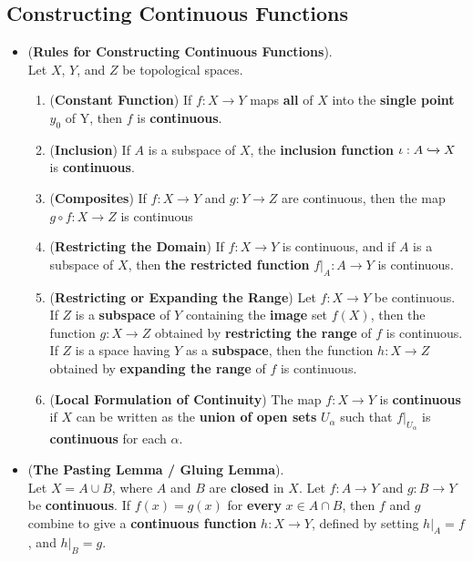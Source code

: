 \documentclass[11pt]{article}
\begin{document}
\subsection{Constructing Continuous Functions}
\begin{itemize}
\item \begin{proposition}(\textbf{Rules for Constructing Continuous Functions}). \citep{munkres2000topology}\\
Let $X$, $Y$, and $Z$ be topological spaces.
\begin{enumerate}
\item (\textbf{Constant Function}) If $f : X \rightarrow Y$ maps \textbf{all} of $X$ into the \textbf{single point} $y_0$ of Y, then $f$ is \textbf{continuous}.
\item (\textbf{Inclusion}) If $A$ is a subspace of $X$, the \textbf{inclusion function} $\iota : A \xhookrightarrow{} X$ is  \textbf{continuous}.
\item (\textbf{Composites}) If $f : X \rightarrow Y$ and $g : Y \rightarrow Z$ are continuous, then the map $g \circ f : X \rightarrow Z$ is continuous
\item (\textbf{Restricting the Domain}) If $f : X \rightarrow Y$ is continuous, and if $A$ is a subspace of $X$, then \textbf{the restricted function} $f|_{A}: A \rightarrow Y$ is continuous.
\item (\textbf{Restricting or Expanding the Range}) Let $f : X \rightarrow Y$ be continuous. If $Z$ is a \textbf{subspace} of $Y$ containing the \textbf{image} set $f(X)$, then the function $g : X \rightarrow Z$ obtained by \textbf{restricting the range} of $f$ is continuous.  If $Z$ is a space having $Y$ as a \textbf{subspace}, then the function $h : X \rightarrow Z$ obtained by \textbf{expanding the range} of $f$ is continuous.
\item (\textbf{Local Formulation of Continuity}) The map  $f : X \rightarrow Y$ is \textbf{continuous} if $X$ can be written as the \textbf{union of open sets} $U_{\alpha}$ such that $f|_{U_{\alpha}}$ is \textbf{continuous} for each $\alpha$.
\end{enumerate}
\end{proposition}

\item \begin{theorem} (\textbf{The Pasting Lemma / Gluing Lemma}). \citep{munkres2000topology} \\ 
Let $X = A \cup B$, where $A$ and $B$ are \textbf{closed} in $X$. Let $f : A \rightarrow Y$ and $g : B \rightarrow Y$ be \textbf{continuous}. If $f(x) = g(x)$ for \textbf{every} $x \in A \cap B$, then $f$ and $g$ combine to give a \textbf{continuous function} $h : X \rightarrow Y$, defined by setting $h|_{A} = f$, and $h|_{B} = g$.
\end{theorem}


\end{itemize}
\end{document}
